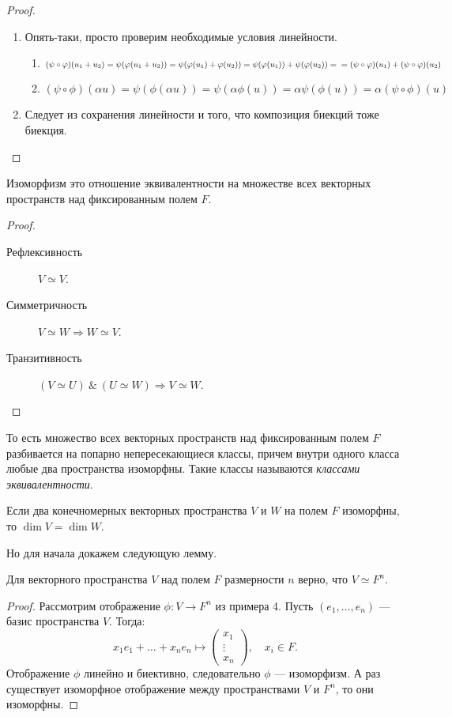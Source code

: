 \begin{proof} \ 
\begin{enumerate}
\item Опять-таки, просто проверим необходимые условия линейности.
\begin{enumerate}
\item $(\psi \circ \phi)(u_1 + u_2) = \psi(\phi(u_1 + u_2)) = \psi(\phi(u_1) + \phi(u_2)) = \psi(\phi(u_1)) + \psi(\phi(u_2)) = \\ = (\psi \circ\phi)(u_1) + (\psi \circ \phi)(u_2)$
\item $(\psi \circ \phi)(\alpha u) = \psi(\phi(\alpha u)) = \psi(\alpha\phi(u)) = \alpha \psi(\phi(u)) = \alpha (\psi \circ \phi) (u)$
\end{enumerate}
\item Следует из сохранения линейности и того, что композиция биекций тоже биекция.
\end{enumerate}
\end{proof}

\begin{Consequence}
Изоморфизм это отношение эквивалентности на множестве всех векторных пространств над фиксированным полем $F$.
\end{Consequence}
\begin{proof} \ 
\begin{description}
\item[Рефлексивность] $V \simeq V$.
\item[Симметричность] $V \simeq W \Rightarrow W \simeq V$.
\item[Транзитивность] $(V \simeq U)\ \&\ (U \simeq W) \Rightarrow V \simeq W$.
\end{description}
\end{proof}

То есть множество всех векторных пространств над фиксированным полем $F$ разбивается на попарно непересекающиеся классы, причем внутри одного класса любые два пространства изоморфны. Такие классы называются \textit{классами эквивалентности}.

\begin{Theorem}
Если два конечномерных векторных пространства $V$ и $W$ на полем $F$ изоморфны, то $\dim V = \dim W$.
\end{Theorem}

Но для начала докажем следующую лемму.

\begin{Lemma}
Для векторного пространства $V$ над полем $F$ размерности $n$ верно, что $V \simeq F^n$.
\end{Lemma}
\begin{proof}
Рассмотрим отображение $\phi: V \rightarrow F^n$ из примера 4. Пусть $(e_1, \ldots, e_n)$ --- базис пространства $V$. Тогда:
\[
x_1e_1 + \ldots + x_ne_n \mapsto 
\begin{pmatrix*}
x_1 \\
\vdots \\
x_n
\end{pmatrix*}, \quad x_i \in F.
\]
Отображение $\phi$ линейно и биективно, следовательно $\phi$ --- изоморфизм. А раз существует изоморфное отображение между пространствами $V$ и $F^n$, то они изоморфны.
\end{proof}


